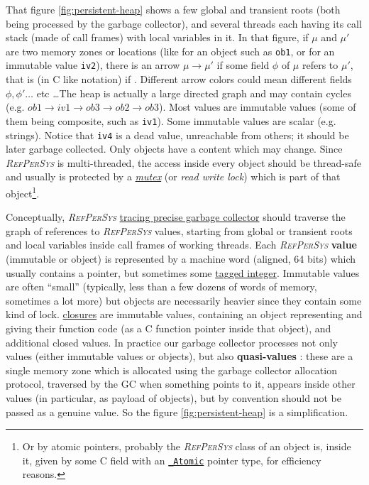 \documentclass[11pt,a4paper,svgnames]{article}
\newcommand{\RefPerSys}{{\textit{\textsc{RefPerSys}}}}
\begin{document}
That figure \ref{fig:persistent-heap} shows a few global and transient
roots (both being processed by the garbage collector), and several
threads each having its call stack (made of call frames) with local
variables in it. In that figure, if $\mu$ and $\mu'$ are two memory
zones or locations (like for an object such as \texttt{ob1}, or for an
immutable value \texttt{iv2}), there is an arrow $\mu \rightarrow
\mu'$ if some field $\phi$ of $\mu$ refers to $\mu'$, that is (in C
like notation) if . Different
arrow colors could mean different fields $\phi, \phi' \ldots$ etc
\ldots The heap is actually a large directed graph and may contain
cycles (e.g. $ ob1 \rightarrow iv1 \rightarrow ob3 \rightarrow ob2
\rightarrow ob3 $). Most values are immutable values (some of them
being composite, such as \texttt{iv1}). Some immutable values are
scalar (e.g. strings). Notice that \texttt{iv4} is a dead value,
unreachable from others; it should be later garbage collected.  Only
objects have a content which may change. Since {\RefPerSys} is
multi-threaded, the access inside every object should be thread-safe
and usually is protected by a
\href{https://en.wikipedia.org/wiki/Lock\_(computer\_science)}{\textit{mutex}}
(or \textit{read write lock}) which is part of that object\footnote{Or
by atomic pointers, probably the {\RefPerSys} class of an object is,
inside it, given by some C field with an
\href{https://en.cppreference.com/w/c/atomic}{\texttt{\_Atomic}}
pointer type, for efficiency reasons.}.


Conceptually, {\RefPerSys}
\href{https://en.wikipedia.org/wiki/Tracing_garbage_collection}{tracing
  precise garbage collector} should traverse the graph of references
to {\RefPerSys} values, starting from global or transient roots and
local variables inside call frames of working threads. Each
{\RefPerSys} \textbf{value}  (immutable or object) is
represented by a machine word (aligned, 64 bits) which usually
contains a pointer, but sometimes some
\href{https://en.wikipedia.org/wiki/Tagged\_pointer}{tagged integer}.
Immutable values are often ``small'' (typically, less than a few dozens of words of memory, sometimes a lot more) but
objects are necessarily heavier since they contain some kind of
lock. \href{https://en.wikipedia.org/wiki/Closure\_(computer_programming)}{closures}
are immutable values, containing an object representing and giving
their function code (as a C function pointer inside that object), and
additional closed values. In practice our garbage collector processes
not only values (either immutable values or objects), but also
\textbf{quasi-values} : these are a single memory
zone which is allocated using the garbage collector allocation
protocol, traversed by the GC when something points to it, appears
inside other values (in particular, as payload  of objects), but by
convention should not be passed as a genuine value. So the figure
\ref{fig:persistent-heap} is a simplification.
\end{document}

